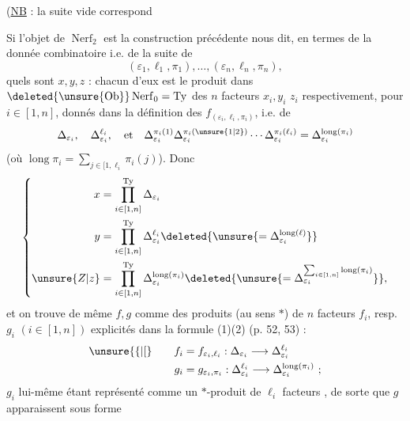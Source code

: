 (\uline{NB} : la suite vide correspond


Si l'objet de $\operatorname{Nerf}_2$ est
la construction précédente nous dit, en termes de la donnée combinatoire i.e. de la suite de 
\[
(\varepsilon_1,\ell_1,\pi_1),\ldots,(\varepsilon_n,\ell_n,\pi_n),
\]
quels sont $x,y,z$ : chacun d'eux est le produit dans $\deleted{\unsure{\operatorname{Ob}}}\operatorname{Nerf}_0=\mathrm{Ty}$ des $n$ facteurs $x_i,y_i$ $z_i$ respectivement, pour $i\in[1,n]$, donnés dans la définition des $f_{(\varepsilon_i,\ell_i,\pi_i)}$, i.e. de
\[
\Delta_{\varepsilon_i},\quad\Delta_{\varepsilon_i}^{\ell_i},\quad\text{et}\quad
\Delta_{\varepsilon_i}^{\pi_i(1)}\Delta_{\varepsilon_i}^{\pi_i(\unsure{1|2})}\cdots
\Delta_{\varepsilon_i}^{\pi_i(\ell_i)}=\Delta_{\varepsilon_i}^{\operatorname{long}(\pi_i)}
\]
(où $\operatorname{long}\pi_i=\sum_{j\in[1,\ell_i}\pi_i(j)$). Donc
\[
\left\{\begin{aligned}
x&=\prod_{i\in[1,n]}^{\mathrm{Ty}}\Delta_{\varepsilon_i}\\
y&=\prod_{i\in[1,n]}^{\mathrm{Ty}}\Delta_{\varepsilon_i}^{\ell_i}
\deleted{\unsure{=\Delta_{\varepsilon_i}^{\operatorname{long}(\ell)}}}\\
\unsure{Z|z}&=\prod_{i\in[1,n]}^{\mathrm{Ty}}\Delta_{\varepsilon_i}^{\operatorname{long}(\pi_i)}
\deleted{\unsure{=\Delta_{\varepsilon_i}^{\sum_{i\in[1,n]}\operatorname{long}(\pi_i)}}},
\end{aligned}\right.
\]
et on trouve de même $f,g$ comme des produits (au sens $*$) de $n$ facteurs $f_i$, resp. $g_i$ $(i\in[1,n])$ explicités dans la formule (1)(2) (p. 52, 53) :
\[
\begin{aligned}
\unsure{\{|[} \qquad f_i&=f_{\varepsilon_i,\ell_i}:\Delta_{\varepsilon_i}\longrightarrow\Delta_{\varepsilon_i}^{\ell_i}\\
g_i&=g_{\varepsilon_i,\pi_i}:\Delta_{\varepsilon_i}^{\ell_i}\longrightarrow\Delta_{\varepsilon_i}^{\operatorname{long}(\pi_i)}\ ; 
\end{aligned}
\]
$g_i$ lui-même étant représenté comme un $*$-produit de $\ell_i$ facteurs , de sorte que  $g$ apparaissent sous forme

